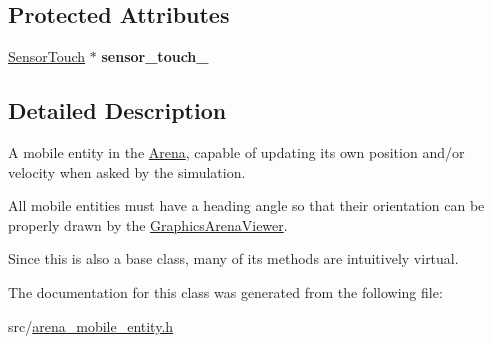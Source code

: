 \subsection*{Protected Attributes}
\begin{DoxyCompactItemize}
\item 
\hyperlink{classSensorTouch}{Sensor\+Touch} $\ast$ {\bfseries sensor\+\_\+touch\+\_\+}\hypertarget{classArenaMobileEntity_a260fd3fba196ee9ab56f9f2ce6ab4a21}{}\label{classArenaMobileEntity_a260fd3fba196ee9ab56f9f2ce6ab4a21}

\end{DoxyCompactItemize}


\subsection{Detailed Description}
A mobile entity in the \hyperlink{classArena}{Arena}, capable of updating its own position and/or velocity when asked by the simulation. 

All mobile entities must have a heading angle so that their orientation can be properly drawn by the \hyperlink{classGraphicsArenaViewer}{Graphics\+Arena\+Viewer}.

Since this is also a base class, many of its methods are intuitively {\ttfamily virtual}. 

The documentation for this class was generated from the following file\+:\begin{DoxyCompactItemize}
\item 
src/\hyperlink{arena__mobile__entity_8h}{arena\+\_\+mobile\+\_\+entity.\+h}\end{DoxyCompactItemize}
